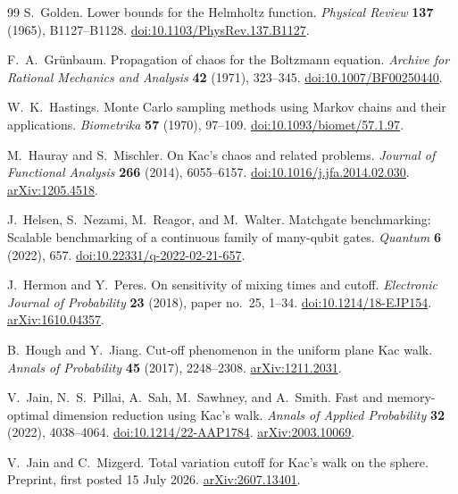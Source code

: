 \documentclass[11pt]{article}
\theoremstyle{definition}\newtheorem{definition}[theorem]{Definition}
\theoremstyle{remark}\newtheorem{remark}[theorem]{Remark}
\begin{document}
\begin{thebibliography}{99}
 S.~Golden.
Lower bounds for the Helmholtz function.
\emph{Physical Review} \textbf{137} (1965), B1127--B1128.
\href{https://doi.org/10.1103/PhysRev.137.B1127}{doi:10.1103/PhysRev.137.B1127}.

 F.~A.~Gr\"unbaum.
Propagation of chaos for the Boltzmann equation.
\emph{Archive for Rational Mechanics and Analysis} \textbf{42} (1971), 323--345.
\href{https://doi.org/10.1007/BF00250440}{doi:10.1007/BF00250440}.

 W.~K.~Hastings.
Monte Carlo sampling methods using Markov chains and their applications.
\emph{Biometrika} \textbf{57} (1970), 97--109.
\href{https://doi.org/10.1093/biomet/57.1.97}{doi:10.1093/biomet/57.1.97}.

 M.~Hauray and S.~Mischler.
On Kac's chaos and related problems.
\emph{Journal of Functional Analysis} \textbf{266} (2014), 6055--6157.
\href{https://doi.org/10.1016/j.jfa.2014.02.030}{doi:10.1016/j.jfa.2014.02.030}.
\href{https://arxiv.org/abs/1205.4518}{arXiv:1205.4518}.

 J.~Helsen, S.~Nezami, M.~Reagor, and M.~Walter.
Matchgate benchmarking: Scalable benchmarking of a continuous family of many-qubit gates.
\emph{Quantum} \textbf{6} (2022), 657.
\href{https://doi.org/10.22331/q-2022-02-21-657}{doi:10.22331/q-2022-02-21-657}.

 J.~Hermon and Y.~Peres.
On sensitivity of mixing times and cutoff.
\emph{Electronic Journal of Probability} \textbf{23} (2018), paper no.~25, 1--34.
\href{https://doi.org/10.1214/18-EJP154}{doi:10.1214/18-EJP154}.
\href{https://arxiv.org/abs/1610.04357}{arXiv:1610.04357}.

 B.~Hough and Y.~Jiang.
Cut-off phenomenon in the uniform plane Kac walk.
\emph{Annals of Probability} \textbf{45} (2017), 2248--2308.
\href{https://arxiv.org/abs/1211.2031}{arXiv:1211.2031}.

 V.~Jain, N.~S.~Pillai, A.~Sah, M.~Sawhney, and A.~Smith.
Fast and memory-optimal dimension reduction using Kac's walk.
\emph{Annals of Applied Probability} \textbf{32} (2022), 4038--4064.
\href{https://doi.org/10.1214/22-AAP1784}{doi:10.1214/22-AAP1784}.
\href{https://arxiv.org/abs/2003.10069}{arXiv:2003.10069}.

 V.~Jain and C.~Mizgerd.
Total variation cutoff for Kac's walk on the sphere.
Preprint, first posted 15 July 2026.
\href{https://arxiv.org/abs/2607.13401}{arXiv:2607.13401}.


\end{thebibliography}
\end{document}
